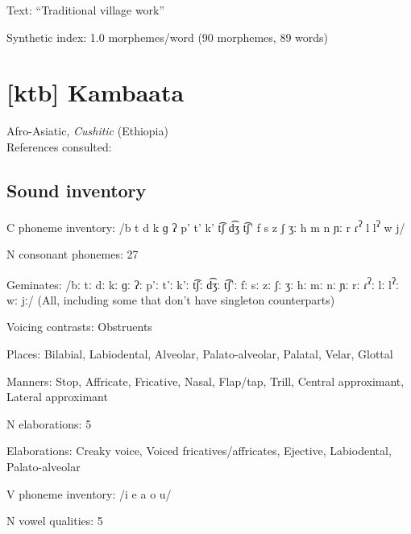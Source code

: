 {\begin{appendixdesc}
\item[Text:] “Traditional village work” \citep[106--107]{Olsen2014}

\item[Synthetic index:] 1.0 morphemes/word (90 morphemes, 89 words)
\end{appendixdesc}
\section*{[ktb] Kambaata}   %
Afro-Asiatic, \textit{Cushitic} (Ethiopia)\medskip\\
References consulted: \citet{Treis2008}

\subsection*{Sound inventory}
\begin{appendixdesc}

\item[C phoneme inventory:] /b t d k ɡ ʔ p’ t’ k’ t͡ʃ d͡ʒ t͡ʃ’ f s z ʃ ʒː h m n ɲː r ɾ\textsuperscript{ʔ} l l\textsuperscript{ʔ} w j/

\item[N consonant phonemes:] 27

\item[Geminates:] /bː tː dː kː ɡː ʔː p’ː t’ː k’ː t͡ʃː d͡ʒː t͡ʃ’ː fː sː zː ʃː ʒː hː mː nː ɲː rː ɾ\textsuperscript{ʔ}ː lː l\textsuperscript{ʔ}ː wː jː/ (All, including some that don’t have singleton counterparts)

\item[Voicing contrasts:] Obstruents

\item[Places:] Bilabial, Labiodental, Alveolar, Palato-alveolar, Palatal, Velar, Glottal

\item[Manners:] Stop, Affricate, Fricative, Nasal, Flap/tap, Trill, Central approximant, Lateral approximant

\item[N elaborations:] 5

\item[Elaborations:] Creaky voice, Voiced fricatives/affricates, Ejective, Labiodental, Palato-alveolar

\item[V phoneme inventory:] /i e a o u/

\item[N vowel qualities:] 5


\end{appendixdesc}}
